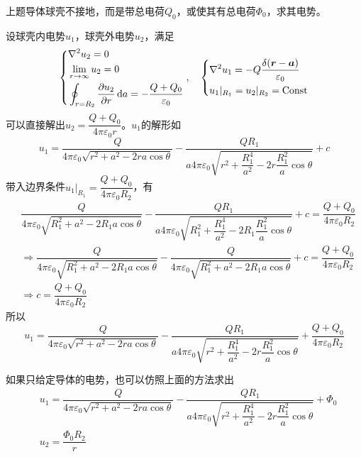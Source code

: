\documentclass{mynote}
\begin{document}
\begin{exercise}{2.10}
    上题导体球壳不接地，而是带总电荷$Q_0$，或使其有总电荷$\varPhi_0$，求其电势。
\end{exercise}
\begin{solution}
    设球壳内电势$u_1$，球壳外电势$u_2$，满足
    \[
    \left\{
        \begin{aligned}
            & \nabla ^2 u_2 = 0 \\
            & \lim_{r \to \infty} u_2 = 0 \\
            & \oint_{r=R_2} \dfrac{\partial u_2}{\partial r} \mathop{}\!\mathrm{d} a = - \dfrac{Q + Q_0}{\varepsilon_0} 
        \end{aligned} 
    \right.    
    ,\quad 
    \left\{
        \begin{aligned}
            & \nabla^2 u_1 = - Q \dfrac{\delta(\boldsymbol{r} - \boldsymbol{a})}{\varepsilon_0} \\
            & u_1 |_{R_1} = u_2|_{R_2} = \mathrm{Const}
        \end{aligned} 
    \right.
    \]
    可以直接解出$u_2 = \dfrac{Q + Q_0}{4\pi \varepsilon_0 r}$。$u_1$的解形如
    \[
    u_1 = \dfrac{Q}{4\pi \varepsilon_0 \sqrt{r^2 + a^2 - 2ra\cos \theta}} - \dfrac{QR_1}{a 4 \pi \varepsilon_0 \sqrt{r^2 + \dfrac{R_1^4}{a^2} - 2r\dfrac{R_1^2}{a} \cos \theta}} + c
    \]
    带入边界条件$u_1 |_{R_1} = \dfrac{Q + Q_0}{4\pi \varepsilon_0 R_2}$，有
    \begin{align*}
        &\dfrac{Q}{4\pi \varepsilon_0 \sqrt{R_1^2 + a^2 - 2R_1a\cos \theta}} - \dfrac{QR_1}{a 4 \pi \varepsilon_0 \sqrt{R_1^2 + \dfrac{R_1^4}{a^2} - 2R_1\dfrac{R_1^2}{a} \cos \theta}} + c = \dfrac{Q + Q_0}{4\pi \varepsilon_0 R_2}  \\
        & \Rightarrow \dfrac{Q}{4\pi \varepsilon_0 \sqrt{R_1^2 + a^2 - 2R_1a\cos \theta}} - \dfrac{Q}{4\pi \varepsilon_0 \sqrt{R_1^2 + a^2 - 2R_1a\cos \theta}} + c = \dfrac{Q + Q_0}{4\pi \varepsilon_0 R_2} \\
        & \Rightarrow c = \dfrac{Q + Q_0}{4\pi \varepsilon_0 R_2}
    \end{align*}
    所以
    \[
    u_1 =     \dfrac{Q}{4\pi \varepsilon_0 \sqrt{r^2 + a^2 - 2ra\cos \theta}} - \dfrac{QR_1}{a 4 \pi \varepsilon_0 \sqrt{r^2 + \dfrac{R_1^4}{a^2} - 2r\dfrac{R_1^2}{a} \cos \theta}} + \dfrac{Q + Q_0}{4\pi \varepsilon_0 R_2}
    \]

    如果只给定导体的电势，也可以仿照上面的方法求出
    \begin{align*}
        & u_1 = \dfrac{Q}{4\pi \varepsilon_0 \sqrt{r^2 + a^2 - 2ra\cos \theta}} - \dfrac{QR_1}{a 4 \pi \varepsilon_0 \sqrt{r^2 + \dfrac{R_1^4}{a^2} - 2r\dfrac{R_1^2}{a} \cos \theta}} + \varPhi_0 \\
        & u_2 = \dfrac{\varPhi_0 R_2}{r}
    \end{align*}
\end{solution}
\end{document}
